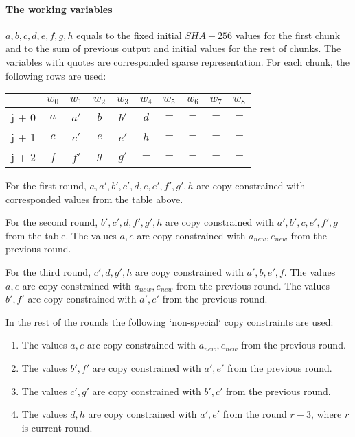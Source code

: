 \paragraph{The working variables}
$ a,  b , c , d, e, f, g, h$ equals to the fixed initial $SHA-256$ values for the first chunk and to the sum of previous output and initial values for the rest of chunks. 
The variables with quotes are corresponded sparse representation.
For each chunk, the following rows are used:
\begin{center}
    \begin{tabular}{ c|c|c|c|c|c|c|c|c|c }
        & $w_0$  & $w_1$  & $w_2$  & $w_3$  & $w_4$  & $w_5$ & $w_6$ & $w_7$ & $w_8$  \\
        \hline
        j + 0 & $a$ & $a'$ & $b$ & $b' $  & $d$  & $-$   & $-$ & $-$  & $-$   \\
        j + 1 & $c$  & $c'$ & $e$ & $e'$ & $h$ & $-$ & $-$ & $-$ & $-$ \\
        j + 2 & $f$ & $f'$ & $g$ & $g'$ & $-$ & $-$ & $-$ & $-$ & $-$\\
    \end{tabular}
\end{center}
For the first round, $a, a', b', c' , d, e, e', f', g', h$ are copy constrained with corresponded values from the table above.

For the second round, $b', c' , d, f', g', h$ are copy constrained with $a', b', c, e', f', g$ from the table.
The values $a, e$ are copy constrained with $a_{new}, e_{new}$ from the previous round.

For the third round, $c' , d, g', h$ are copy constrained with $a', b, e', f$.
The values $a, e$ are copy constrained with $a_{new}, e_{new}$ from the previous round.
The values $b', f'$ are copy constrained with $a', e'$ from the previous round.

In the rest of the rounds the following `non-special` copy constraints are used:
\begin{enumerate}
\item The values $a, e$ are copy constrained with $a_{new}, e_{new}$ from the previous round.
\item The values $b', f'$ are copy constrained with $a', e'$ from the previous round.
\item The values $c', g'$ are copy constrained with $b', c'$ from the previous round.
\item The values $d, h$ are copy constrained with $a', e'$ from the round $r - 3$, where $r$ is current round.
\end{enumerate}

